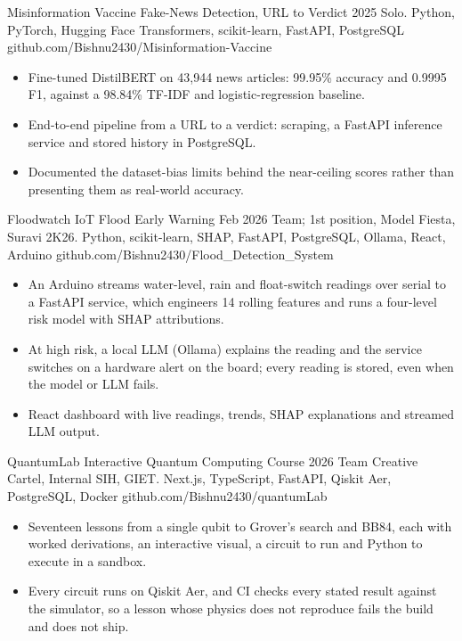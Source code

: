 \cvgap

\cvproject
{Misinformation Vaccine}
{Fake-News Detection, URL to Verdict}
{2025}
{Solo. Python, PyTorch, Hugging Face Transformers, scikit-learn, FastAPI, PostgreSQL}
{github.com/Bishnu2430/Misinformation-Vaccine}
{}
\begin{itemize}
\item Fine-tuned DistilBERT on 43,944 news articles: 99.95\% accuracy and 0.9995 F1, against a 98.84\% TF-IDF and logistic-regression baseline.
\item End-to-end pipeline from a URL to a verdict: scraping, a FastAPI inference service and stored history in PostgreSQL.
\item Documented the dataset-bias limits behind the near-ceiling scores rather than presenting them as real-world accuracy.
\end{itemize}

\cvgap

\cvproject
{Floodwatch}
{IoT Flood Early Warning}
{Feb 2026}
{Team; 1st position, Model Fiesta, Suravi 2K26. Python, scikit-learn, SHAP, FastAPI, PostgreSQL, Ollama, React, Arduino}
{github.com/Bishnu2430/Flood\_Detection\_System}
{}
\begin{itemize}
\item An Arduino streams water-level, rain and float-switch readings over serial to a FastAPI service, which engineers 14 rolling features and runs a four-level risk model with SHAP attributions.
\item At high risk, a local LLM (Ollama) explains the reading and the service switches on a hardware alert on the board; every reading is stored, even when the model or LLM fails.
\item React dashboard with live readings, trends, SHAP explanations and streamed LLM output.
\end{itemize}

\cvgap

\cvproject
{QuantumLab}
{Interactive Quantum Computing Course}
{2026}
{Team Creative Cartel, Internal SIH, GIET. Next.js, TypeScript, FastAPI, Qiskit Aer, PostgreSQL, Docker}
{github.com/Bishnu2430/quantumLab}
{}
\begin{itemize}
\item Seventeen lessons from a single qubit to Grover's search and BB84, each with worked derivations, an interactive visual, a circuit to run and Python to execute in a sandbox.
\item Every circuit runs on Qiskit Aer, and CI checks every stated result against the simulator, so a lesson whose physics does not reproduce fails the build and does not ship.
\end{itemize}

